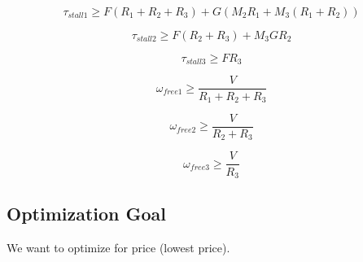 \documentclass{article}
\begin{document}
\begin{equation}
    \tau_{stall 1} \geq F(R_1 + R_2 + R_3) + G(M_2 R_1 + M_3 (R_1 + R_2))
\end{equation}

\begin{equation}
    \tau_{stall 2} \geq F(R_2 + R_3) + M_3 G R_2
\end{equation}

\begin{equation}
    \tau_{stall 3} \geq F R_3
\end{equation}

\begin{equation}
    \omega_{free 1} \geq \frac{V}{R_1 + R_2 + R_3}
\end{equation}

\begin{equation}
    \omega_{free 2} \geq \frac{V}{R_2 + R_3}
\end{equation}

\begin{equation}
    \omega_{free 3} \geq \frac{V}{R_3}
\end{equation}

\FloatBarrier
\subsection{Optimization Goal}

We want to optimize for price (lowest price).
\end{document}

